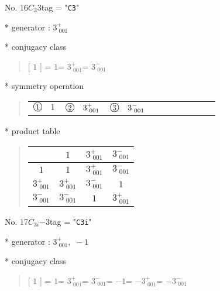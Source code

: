 \documentclass[fleqn,10pt,landscape]{jsarticle}
\begin{document}
\newpage

No. 16\quad$C_{3}$\quad$3$\quad[ trigonal ]
tag = "{\tt C3}"

* generator : $3^{+}_{\,\,001}$

* conjugacy class
\begin{quote}
[ $1$ ] = \quad $1$\newline[ $3^{+}_{\,\,001}$ ] = \quad $3^{+}_{\,\,001}$\newline[ $3^{-}_{\,\,001}$ ] = \quad $3^{-}_{\,\,001}$\newline
\end{quote}

* symmetry operation
\begin{quote}
\begin{tabular}{llllllllll}
$ {\ooalign{\hfil\resizebox{.8\width}{\height}{1}\hfil\crcr\raise.1ex\hbox{\large$\bigcirc$}}}\quad 1 $ & $ {\ooalign{\hfil\resizebox{.8\width}{\height}{2}\hfil\crcr\raise.1ex\hbox{\large$\bigcirc$}}}\quad 3^{+}_{\,\,001} $ & $ {\ooalign{\hfil\resizebox{.8\width}{\height}{3}\hfil\crcr\raise.1ex\hbox{\large$\bigcirc$}}}\quad 3^{-}_{\,\,001} $
\end{tabular}
\end{quote}

* product table
\begin{quote}
\begin{tabular}{cccc} \hline \hline
 & $ 1 $ & $ 3^{+}_{\,\,001} $ & $ 3^{-}_{\,\,001} $ \\ \hline
$ 1 $ & $ 1 $ & $ 3^{+}_{\,\,001} $ & $ 3^{-}_{\,\,001} $ \\
$ 3^{+}_{\,\,001} $ & $ 3^{+}_{\,\,001} $ & $ 3^{-}_{\,\,001} $ & $ 1 $ \\
$ 3^{-}_{\,\,001} $ & $ 3^{-}_{\,\,001} $ & $ 1 $ & $ 3^{+}_{\,\,001} $ \\
 \hline \hline
\end{tabular}
\end{quote}

\newpage

No. 17\quad$C_{3i}$\quad$-3$\quad[ trigonal ]
tag = "{\tt C3i}"

* generator : $3^{+}_{\,\,001},\,\,-1$

* conjugacy class
\begin{quote}
[ $1$ ] = \quad $1$\newline[ $3^{+}_{\,\,001}$ ] = \quad $3^{+}_{\,\,001}$\newline[ $3^{-}_{\,\,001}$ ] = \quad $3^{-}_{\,\,001}$\newline[ $-1$ ] = \quad $-1$\newline[ $-3^{+}_{\,\,001}$ ] = \quad $-3^{+}_{\,\,001}$\newline[ $-3^{-}_{\,\,001}$ ] = \quad $-3^{-}_{\,\,001}$\newline
\end{quote}
\end{document}
